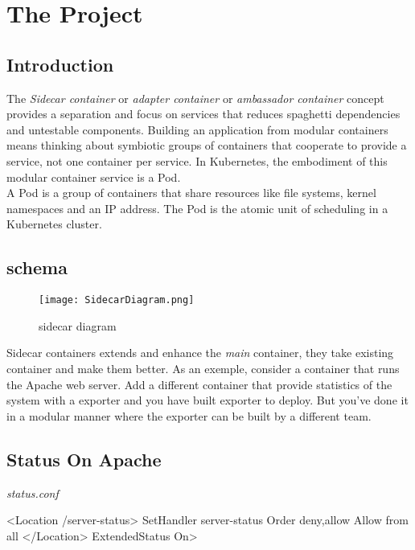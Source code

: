 \section{The Project}

\subsection{Introduction}

The \emph{Sidecar container} or \emph{adapter container} or \emph{ambassador container} concept provides a separation and focus on services that reduces spaghetti dependencies and untestable components. Building an application from modular containers means thinking about symbiotic groups of containers that cooperate to provide a service, not one container per service. In Kubernetes, the embodiment of this modular container service is a Pod.\\

A Pod is a group of containers that share resources like file systems, kernel namespaces and an IP address. The Pod is the atomic unit of scheduling in a Kubernetes cluster.

\subsection{schema}

\begin{figure}[ht]
  \caption{sidecar diagram}
  \centering
  \texttt{[image: SidecarDiagram.png]}
  \label{fig:SidecarDiagram}
\end{figure}

Sidecar containers extends and enhance the \emph{main} container, they take existing container and make them better. As an exemple, consider a container that runs the Apache web server. Add a different container that provide statistics of the system with a exporter and you have built exporter to deploy. But you've done it in a modular manner where the exporter can be built by a different team.

\subsection{Status On Apache}

\emph{status.conf}
\begin{apachecode}
  <Location /server-status>
  SetHandler server-status
  Order deny,allow
  Allow from all
  </Location> ExtendedStatus On>
\end{apachecode}

